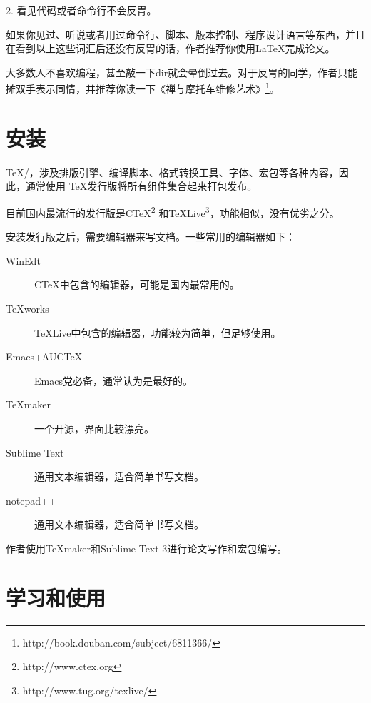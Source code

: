 2. 看见代码或者命令行不会反胃。

如果你见过、听说或者用过命令行、脚本、版本控制、程序设计语言等东西，并且在看到以上这些词汇后还没有反胃的话，作者推荐你使用\LaTeX 完成论文。

大多数人不喜欢编程，甚至敲一下dir就会晕倒过去。对于反胃的同学，作者只能摊双手表示同情，并推荐你读一下《禅与摩托车维修艺术》\footnote{http://book.douban.com/subject/6811366/}。

\section{安装}

\TeX/，涉及排版引擎、编译脚本、格式转换工具、字体、宏包等各种内容，因此，通常使用 \TeX 发行版将所有组件集合起来打包发布。

目前国内最流行的发行版是C\TeX\footnote{http://www.ctex.org} 和\TeX Live\footnote{http://www.tug.org/texlive/}，功能相似，没有优劣之分。

安装发行版之后，需要编辑器来写文档。一些常用的编辑器如下：

\begin{description}
  \item[WinEdt] C\TeX 中包含的编辑器，可能是国内最常用的。
  \item[TeXworks] \TeX Live中包含的编辑器，功能较为简单，但足够使用。
  \item[Emacs+AUCTeX] Emacs党必备，通常认为是最好的。
  \item[TeXmaker] 一个开源，界面比较漂亮。
  \item[Sublime Text] 通用文本编辑器，适合简单书写文档。
  \item[notepad++] 通用文本编辑器，适合简单书写文档。
\end{description}

作者使用TeXmaker和Sublime Text 3进行论文写作和宏包编写。

\section{学习和使用}
